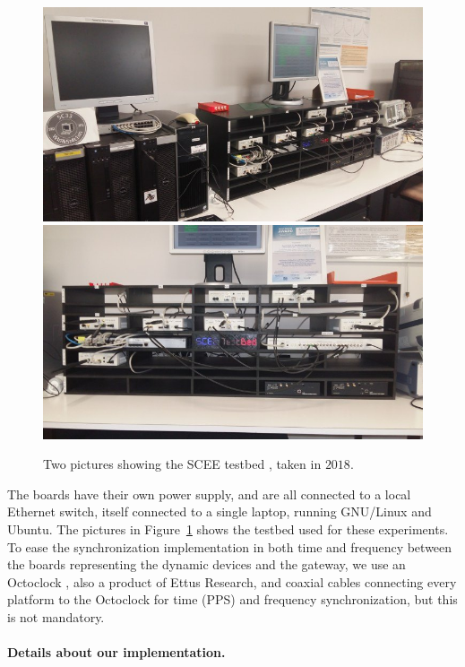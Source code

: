 \begin{figure}[!t]
    \centering
    \includegraphics[width=0.70\linewidth]{SCEE_TestBed1.jpg}
    \vspace*{20pt}
    \includegraphics[width=0.70\linewidth]{SCEE_TestBed2.jpg}
    \caption{Two pictures showing the SCEE testbed \cite[Appendix~3]{Bodinier17}, taken in $2018$.}
    \label{fig:42:photosSCEETestBed}
\end{figure}

The boards have their own power supply, and are all connected to a local Ethernet switch, itself connected to a single laptop, running GNU/Linux and Ubuntu.
The pictures in Figure~\ref{fig:42:photosSCEETestBed} shows the testbed used for these experiments.
To ease the synchronization implementation in both time and frequency between the boards representing the dynamic devices and the gateway, we use an Octoclock \cite{OctoclockProduct}, also a product of Ettus Research,
and coaxial cables connecting every platform to the Octoclock for time (PPS) and frequency synchronization, but this is not mandatory.


\paragraph{Details about our implementation.}

